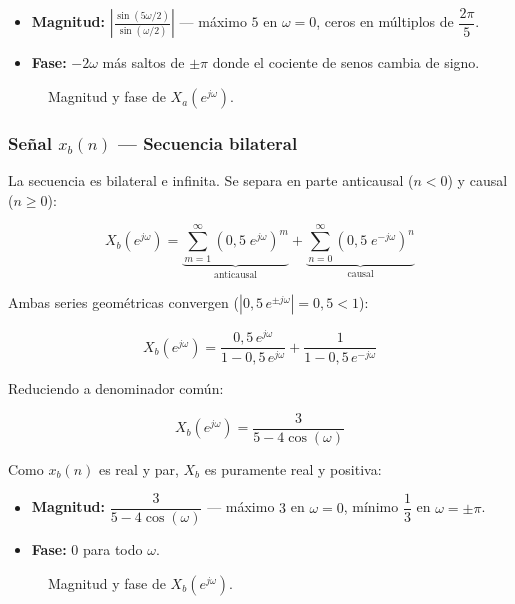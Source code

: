 \documentclass[../Main_Include.tex]{subfiles}
\begin{document}
\begin{itemize}[leftmargin=1.5cm, itemsep=2pt]
    \item \textbf{Magnitud:}
        $\displaystyle\left|\frac{\sin(5\omega/2)}{\sin(\omega/2)}\right|$
        — máximo $5$ en $\omega = 0$, ceros en múltiplos de $\dfrac{2\pi}{5}$.
    \item \textbf{Fase:} $-2\omega$ más saltos de $\pm\pi$ donde el
        cociente de senos cambia de signo.
\end{itemize}

\begin{figure}[H]
    \centering
    \caption{Magnitud y fase de $X_a(e^{j\omega})$.}
\end{figure}

\subsubsection*{Señal $x_b(n)$ — Secuencia bilateral}

La secuencia es bilateral e infinita. Se separa en parte anticausal
($n < 0$) y causal ($n \ge 0$):

\[
    X_b(e^{j\omega})
    = \underbrace{\sum_{m=1}^{\infty}(0{,}5\;e^{j\omega})^m}_{\text{anticausal}}
    + \underbrace{\sum_{n=0}^{\infty}(0{,}5\;e^{-j\omega})^n}_{\text{causal}}
\]

Ambas series geométricas convergen ($|0{,}5\,e^{\pm j\omega}| = 0{,}5 < 1$):

\[
    X_b(e^{j\omega})
    = \frac{0{,}5\,e^{j\omega}}{1 - 0{,}5\,e^{j\omega}}
    + \frac{1}{1 - 0{,}5\,e^{-j\omega}}
\]

Reduciendo a denominador común:

\[
    \boxed{X_b(e^{j\omega}) = \frac{3}{5 - 4\cos(\omega)}}
\]

Como $x_b(n)$ es real y par, $X_b$ es puramente real y positiva:

\begin{itemize}[leftmargin=1.5cm, itemsep=2pt]
    \item \textbf{Magnitud:} $\dfrac{3}{5-4\cos(\omega)}$
        — máximo $3$ en $\omega = 0$, mínimo $\dfrac{1}{3}$ en $\omega = \pm\pi$.
    \item \textbf{Fase:} $0$ para todo $\omega$.
\end{itemize}

\begin{figure}[H]
    \centering
    \caption{Magnitud y fase de $X_b(e^{j\omega})$.}
\end{figure}
\end{document}
